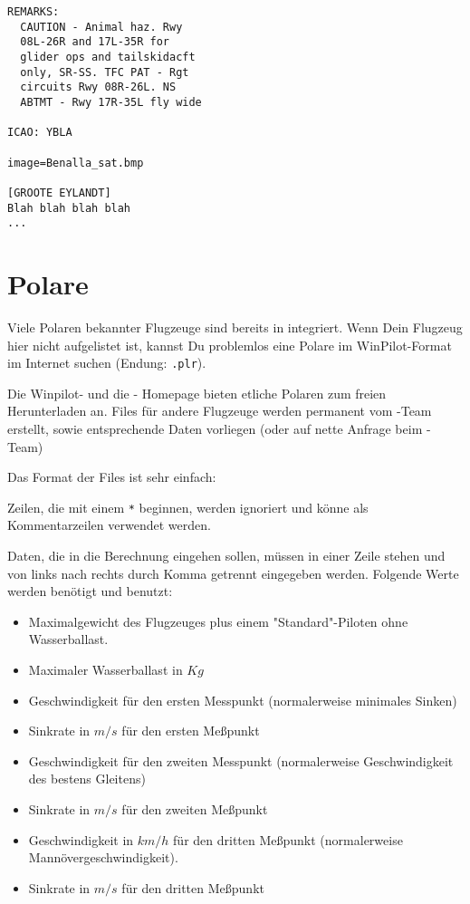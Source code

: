 {{{{\begin{verbatim}
REMARKS:
  CAUTION - Animal haz. Rwy
  08L-26R and 17L-35R for
  glider ops and tailskidacft
  only, SR-SS. TFC PAT - Rgt
  circuits Rwy 08R-26L. NS
  ABTMT - Rwy 17R-35L fly wide

ICAO: YBLA

image=Benalla_sat.bmp

[GROOTE EYLANDT]
Blah blah blah blah
...
\end{verbatim}



\section{Polare}\label{sec:glide-polar}

Viele Polaren bekannter Flugzeuge sind bereits in \xc integriert.  Wenn Dein Flugzeug  hier nicht
aufgelistet ist, kannst Du problemlos eine Polare im {\sc WinPilot}-Format im Internet suchen (Endung:
\verb|.plr|).

Die Winpilot- und die \xc - Homepage bieten etliche Polaren zum freien Herunterladen an. Files für
andere Flugzeuge werden permanent vom \xc-Team erstellt, sowie entsprechende Daten vorliegen (oder
auf nette Anfrage beim \xc-Team)

Das Format der Files ist sehr einfach:

Zeilen, die mit einem \verb|*| beginnen, werden ignoriert und könne als Kommentarzeilen verwendet
werden.

Daten, die in die Berechnung eingehen sollen, müssen in einer Zeile stehen und von links nach rechts durch
Komma getrennt eingegeben werden. Folgende Werte werden benötigt und benutzt:

\begin{itemize}
\item Maximalgewicht des Flugzeuges  plus einem "Standard"-Piloten ohne Wasserballast.
\item Maximaler Wasserballast in $Kg$
\item Geschwindigkeit für den ersten Messpunkt (normalerweise minimales Sinken)
\item Sinkrate in $m/s$ für den ersten Meßpunkt
\item Geschwindigkeit für den zweiten  Messpunkt (normalerweise Geschwindigkeit des bestens
    Gleitens)
\item Sinkrate in $m/s$ für den zweiten Meßpunkt
\item Geschwindigkeit in $km/h$ für den dritten Meßpunkt  (normalerweise Mannövergeschwindigkeit).
\item Sinkrate in $m/s$ für den dritten Meßpunkt
\end{itemize}

}}}}
